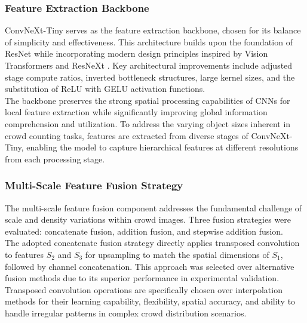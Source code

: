 \subsubsection{Feature Extraction Backbone}
ConvNeXt-Tiny serves as the feature extraction backbone, chosen for its balance of simplicity and effectiveness. This architecture builds upon the foundation of ResNet \cite{he2016deep} while incorporating modern design principles inspired by Vision Transformers \cite{dosovitskiy2020image} and ResNeXt \cite{xie2017aggregated}. Key architectural improvements include adjusted stage compute ratios, inverted bottleneck structures, large kernel sizes, and the substitution of ReLU with GELU activation functions. \\
The backbone preserves the strong spatial processing capabilities of CNNs for local feature extraction while significantly improving global information comprehension and utilization. To address the varying object sizes inherent in crowd counting tasks, features are extracted from diverse stages of ConvNeXt-Tiny, enabling the model to capture hierarchical features at different resolutions from each processing stage.
\subsubsection{Multi-Scale Feature Fusion Strategy}
The multi-scale feature fusion component addresses the fundamental challenge of scale and density variations within crowd images. Three fusion strategies were evaluated: concatenate fusion, addition fusion, and stepwise addition fusion.\\
The adopted concatenate fusion strategy directly applies transposed convolution to features $S_{2}$ and $S_{3}$ for upsampling to match the spatial dimensions of $S_{1}$, followed by channel concatenation. This approach was selected over alternative fusion methods due to its superior performance in experimental validation. Transposed convolution operations are specifically chosen over interpolation methods for their learning capability, flexibility, spatial accuracy, and ability to handle irregular patterns in complex crowd distribution scenarios.

